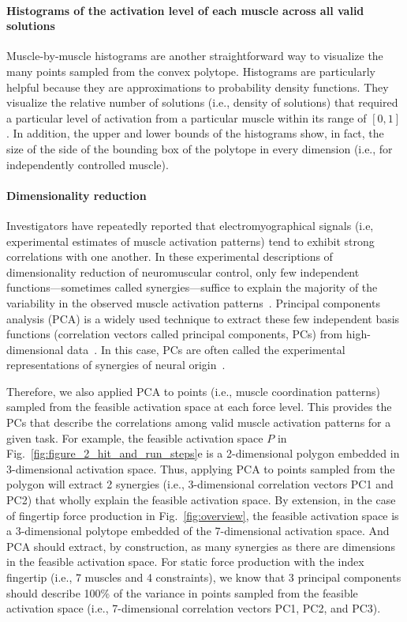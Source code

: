 \documentclass[letterpaper]{article}
\begin{document}
\paragraph*{Histograms of the activation level of each muscle across all valid solutions}

Muscle-by-muscle histograms are another straightforward way to visualize the many points sampled from the convex polytope. Histograms are particularly helpful because they are approximations to probability density functions.
They visualize the relative number of solutions (i.e., density of solutions) that required a particular level of activation from a particular muscle within its range of $[0,1]$.
In addition, the upper and lower bounds of the histograms show, in fact, the size of the side of the bounding box of the polytope in every dimension (i.e., for independently controlled muscle).

\paragraph*{Dimensionality reduction}

Investigators have repeatedly reported that electromyographical signals (i.e, experimental estimates of muscle activation patterns) tend to exhibit strong correlations with one another.
In these experimental descriptions of dimensionality reduction of neuromuscular control, only few independent functions---sometimes called synergies---suffice to explain the majority of the variability in the observed muscle activation patterns~\cite{kutch2012challenges,steele2013number,bizzi2013neural,dingwell2010walkingvariability,steele2015consequences,alessandro2013musclesynergies,krishnamoorthy2003muscle}.
Principal components analysis (PCA) is a widely used technique to extract these few independent basis functions (correlation vectors called principal components, PCs) from high-dimensional data~\cite{Clewley2008Estimating}.
In this case, PCs are often called the experimental representations of synergies of neural origin~\cite{kutch2012challenges}.

Therefore, we also applied PCA to points (i.e., muscle coordination patterns) sampled from the feasible activation space at each force level.
This provides the PCs that describe the correlations among valid muscle activation patterns for a given task.
For example, the feasible activation space $P$ in Fig.~\ref{fig:figure_2_hit_and_run_steps}e is a 2-dimensional polygon embedded in 3-dimensional activation space. Thus, applying PCA to points sampled from the polygon will extract 2 synergies (i.e., 3-dimensional correlation vectors PC1 and PC2) that wholly explain the feasible activation space. By extension, in the case of fingertip force production in Fig.~\ref{fig:overview}, the feasible activation space is a 3-dimensional polytope embedded of the 7-dimensional activation space. And PCA should extract, by construction, as many synergies as there are dimensions in the feasible activation space. For static force production with the index fingertip (i.e., 7 muscles and 4 constraints), we know that 3 principal components should describe 100\% of the variance in points sampled from the feasible activation space (i.e., 7-dimensional correlation vectors PC1, PC2, and PC3).
\end{document}
